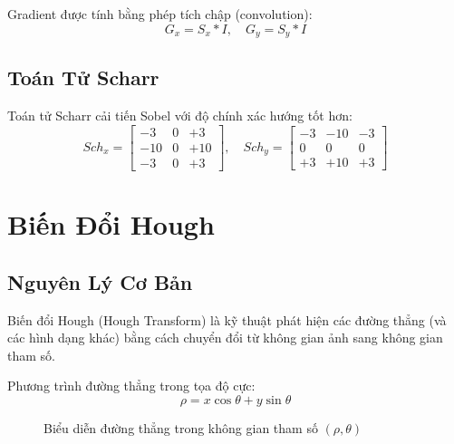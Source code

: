 \documentclass[12pt,a4paper]{report}
\begin{document}
Gradient được tính bằng phép tích chập (convolution):
\begin{equation}
    G_x = S_x * I, \quad G_y = S_y * I
\end{equation}

\subsection{Toán Tử Scharr}
Toán tử Scharr cải tiến Sobel với độ chính xác hướng tốt hơn:
\begin{equation}
    Sch_x = \begin{bmatrix} -3 & 0 & +3 \\ -10 & 0 & +10 \\ -3 & 0 & +3 \end{bmatrix}, \quad
    Sch_y = \begin{bmatrix} -3 & -10 & -3 \\ 0 & 0 & 0 \\ +3 & +10 & +3 \end{bmatrix}
\end{equation}

\section{Biến Đổi Hough}

\subsection{Nguyên Lý Cơ Bản}
Biến đổi Hough (Hough Transform) là kỹ thuật phát hiện các đường thẳng (và các hình dạng khác) bằng cách chuyển đổi từ không gian ảnh sang không gian tham số.

Phương trình đường thẳng trong tọa độ cực:
\begin{equation}
    \rho = x \cos\theta + y \sin\theta
\end{equation}

\begin{figure}[H]
\centering
{}
\caption{Biểu diễn đường thẳng trong không gian tham số $(\rho, \theta)$}
\label{fig:hough_param}
\end{figure}
\end{document}
